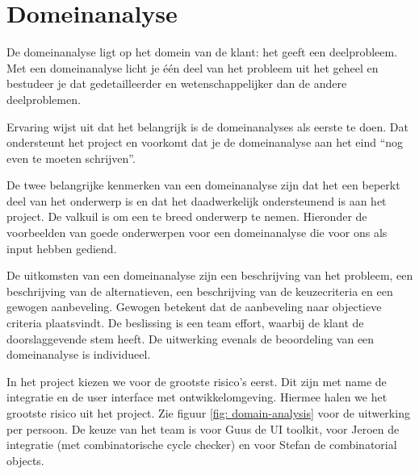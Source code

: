 
\section{Domeinanalyse}

De domeinanalyse ligt op het domein van de klant: het geeft een deelprobleem.
Met een domeinanalyse licht je \'e\'en deel van het probleem uit het geheel
en bestudeer je dat gedetailleerder en wetenschappelijker dan de andere
deelproblemen.

Ervaring wijst uit dat het belangrijk is de domeinanalyses als eerste te doen.
Dat ondersteunt het project en voorkomt dat je
de domeinanalyse aan het eind ``nog even te moeten schrijven''.

De twee belangrijke kenmerken van een domeinanalyse zijn dat het een beperkt
deel van het onderwerp is en dat het daadwerkelijk
ondersteunend is aan het project. De valkuil is om een te breed onderwerp te
nemen. Hieronder de voorbeelden van goede onderwerpen
voor een domeinanalyse die voor ons als input hebben gediend.

De uitkomsten van een domeinanalyse zijn een beschrijving van het probleem,
een beschrijving van de alternatieven, een beschrijving van de keuzecriteria en
een gewogen aanbeveling. Gewogen betekent dat de aanbeveling naar objectieve
criteria plaatsvindt. De beslissing is een team effort, waarbij de klant
de doorslaggevende stem heeft. De uitwerking evenals de beoordeling van
een domeinanalyse is individueel.

In het project kiezen we voor de grootste risico's eerst. Dit zijn met name
de integratie en de user interface met ontwikkelomgeving.
Hiermee halen we het grootste risico uit het project. Zie figuur \ref{fig: domain-analysis}
voor de uitwerking per persoon. De keuze van het team is voor Guus de UI toolkit,
voor Jeroen de integratie (met combinatorische cycle checker) en voor Stefan de
combinatorial objects.

